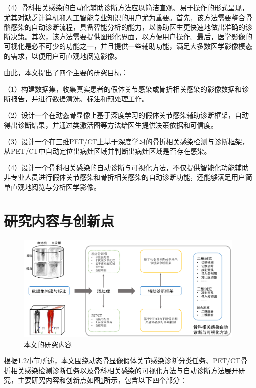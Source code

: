 （4）骨科相关感染的自动化辅助诊断方法应以简洁直观、易于操作的形式呈现，尤其对缺乏计算机和人工智能专业知识的用户尤为重要。首先，该方法需要整合骨骼感染的自动诊断流程，具备智能分析的能力，以协助医生更快速地做出准确的诊断决策。其次，该方法需要提供图形化界面，以方便用户操作。最后，医学影像的可视化是必不可少的功能之一，并且提供一些辅助功能，满足大多数医学影像模态的需求，以便用户可直观地阅览影像。

由此，本文提出了四个主要的研究目标：

（1）构建数据集，收集真实患者的假体关节感染或骨折相关感染的影像数据和诊断报告，并进行数据清洗、标注和预处理工作。

（2）设计一个在动态骨显像上基于深度学习的假体关节感染辅助诊断框架，自动得出诊断结果，并通过类激活图等方法给医生提供决策依据和可信度。

（3）设计一个在三维PET/CT上基于深度学习的骨折相关感染检测与诊断框架，从PET/CT中自动定位出病灶区域并判断出病灶区域是否存在感染。

（4）设计一个骨科相关感染的自动诊断与可视化方法，不仅提供智能化功能辅助非专业人员进行假体关节感染和骨折相关感染的自动诊断功能，还能够满足用户简单直观地阅览与分析医学影像。

\section{研究内容与创新点}

\begin{figure}[htbp]
  \centering
  \includegraphics[width=\textwidth]{figures/chap01_research.png}
  \caption{本文的研究内容}
  \label{fig:chap01_research}
\end{figure}

根据1.2小节所述，本文围绕动态骨显像假体关节感染诊断分类任务、PET/CT骨折相关感染检测诊断任务以及骨科相关感染的可视化方法与自动诊断方法展开研究，主要研究内容和创新点如图\ref{fig:chap01_research}所示，包含以下四个部分：


